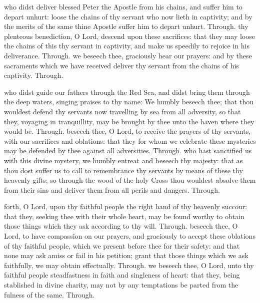 \begin{multicols}{2}
 who didst deliver blessed Peter the Apostle from his chains, and suffer him to depart unhurt: loose the chains of thy servant who now lieth in captivity; and by the merits of the same thine Apostle suffer him to depart unhurt. Through.
 thy plenteous benediction, O Lord, descend upon these sacrifices: that they may loose the chains of this thy servant in captivity, and make us speedily to rejoice in his deliverance. Through.
 we beseech thee, graciously hear our prayers: and by these sacraments which we have received deliver thy servant from the chains of his captivity. Through.

 who didst guide our fathers through the Red Sea, and didst bring them through the deep waters, singing praises to thy name: We humbly beseech thee; that thou wouldest defend thy servants now travelling by sea from all adversity, so that they, voyaging in tranquillity, may be brought by thee unto the haven where they would be. Through.
 beseech thee, O Lord, to receive the prayers of thy servants, with our sacrifices and oblations: that they for whom we celebrate these mysteries may be defended by thee against all adversities. Through.
 who hast sanctified us with this divine mystery, we humbly entreat and beseech thy majesty: that as thou dost suffer us to call to remembrance thy servants by means of these thy heavenly gifts; so through the wood of the holy Cross thou wouldest absolve them from their sins and deliver them from all perils and dangers. Through.

 forth, O Lord, upon thy faithful people the right hand of thy heavenly succour: that they, seeking thee with their whole heart, may be found worthy to obtain those things which they ask according to thy will. Through.
 beseech thee, O Lord, to have compassion on our prayers, and graciously to accept these oblations of thy faithful people, which we present before thee for their safety: and that none may ask amiss or fail in his petition; grant that those things which we ask faithfully, we may obtain effectually. Through.
 we beseech thee, O Lord, unto thy faithful people steadfastness in faith and singleness of heart: that they, being stablished in divine charity, may not by any temptations be parted from the fulness of the same. Through.


\end{multicols}
